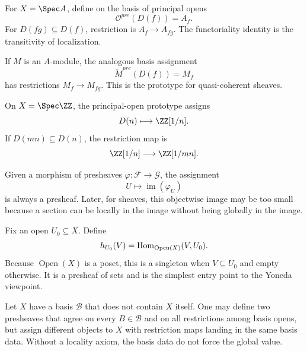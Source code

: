 \begin{example}
For $X=\Spec A$, define on the basis of principal opens
\[
\mathcal O^{pre}(D(f))=A_f.
\]
For $D(fg)\subseteq D(f)$, restriction is $A_f\to A_{fg}$.  The functoriality identity is
the transitivity of localization.
\end{example}

\begin{example}
If $M$ is an $A$-module, the analogous basis assignment
\[
\widetilde M^{pre}(D(f))=M_f
\]
has restrictions $M_f\to M_{fg}$.  This is the prototype for quasi-coherent sheaves.
\end{example}

\begin{example}
On $X=\Spec\ZZ$, the principal-open prototype assigns
\[
D(n)\longmapsto \ZZ[1/n].
\]
If $D(mn)\subseteq D(n)$, the restriction map is
\[
\ZZ[1/n]\longrightarrow\ZZ[1/mn].
\]
\end{example}

\begin{example}
Given a morphism of presheaves $\varphi:\mathcal F\to\mathcal G$, the assignment
\[
U\mapsto\operatorname{im}(\varphi_U)
\]
is always a presheaf.  Later, for sheaves, this objectwise image may be too small because a
section can be locally in the image without being globally in the image.
\end{example}

\begin{example}
Fix an open $U_0\subseteq X$.  Define
\[
h_{U_0}(V)=\operatorname{Hom}_{\operatorname{Open}(X)}(V,U_0).
\]
Because $\operatorname{Open}(X)$ is a poset, this is a singleton when $V\subseteq U_0$ and
empty otherwise.  It is a presheaf of sets and is the simplest entry point to the Yoneda
viewpoint.
\end{example}

\begin{example}
Let $X$ have a basis $\mathcal B$ that does not contain $X$ itself.  One may define two
presheaves that agree on every $B\in\mathcal B$ and on all restrictions among basis opens,
but assign different objects to $X$ with restriction maps landing in the same basis data.
Without a locality axiom, the basis data do not force the global value.
\end{example}
